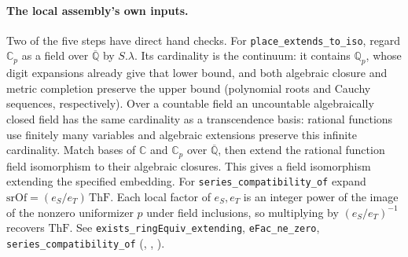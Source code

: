 \paragraph{The local assembly's own inputs.}
Two of the five steps have direct hand checks. For
\nolinkurl{place_extends_to_iso}, regard \(\mathbb C_p\) as a field over
\(\overline{\mathbb Q}\) by \(S.\lambda\). Its cardinality is the
continuum: it contains \(\mathbb Q_p\), whose digit expansions already
give that lower bound, and both algebraic closure and metric completion
preserve the upper bound (polynomial roots and Cauchy sequences,
respectively). Over a countable field an uncountable algebraically
closed field has the same cardinality as a transcendence basis:
rational functions use finitely many variables and algebraic extensions
preserve this infinite cardinality. Match bases of \(\mathbb C\) and
\(\mathbb C_p\) over \(\overline{\mathbb Q}\), then extend the rational
function field isomorphism to their algebraic closures. This gives a
field isomorphism extending the specified embedding. For
\nolinkurl{series_compatibility_of} expand
\(\mathrm{srOf}=(e_S/e_T)\,\mathrm{ThF}\). Each local factor of
\(e_S,e_T\) is an integer power of the image of the nonzero uniformizer
\(p\) under field inclusions, so multiplying by \((e_S/e_T)^{-1}\)
recovers \(\mathrm{ThF}\). See \nolinkurl{exists_ringEquiv_extending},
\nolinkurl{eFac_ne_zero}, \nolinkurl{series_compatibility_of}
(,
,
).

